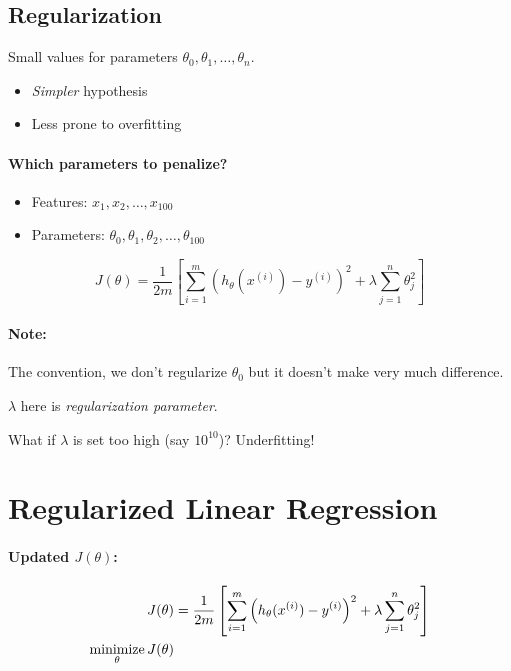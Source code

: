 \subsection*{Regularization}
Small values for parameters $\theta_0, \theta_1, \dots, \theta_n$.
\begin{itemize}
    \item \emph{Simpler} hypothesis
    \item Less prone to overfitting
\end{itemize}

\paragraph{Which parameters to penalize?}
\begin{itemize}
    \item Features: $x_1, x_2, \dots, x_{100}$
    \item Parameters: $\theta_0, \theta_1, \theta_2, \dots, \theta_{100}$
\end{itemize}
\begin{equation*}
    J(\theta) = \frac{1}{2m}\left[
        \sum_{i=1}^m\left(
        h_\theta(x^{(i)}) - y^{(i)}
        \right)^2 + \lambda\sum_{j=1}^n\theta_j^2
        \right]
\end{equation*}
\paragraph{Note:} The convention, we don't regularize $\theta_0$ but it doesn't
make very much difference.

$\lambda$ here is \emph{regularization parameter}.

What if $\lambda$ is set too high (say $10^{10}$)? Underfitting!

\section{Regularized Linear Regression}
\paragraph{Updated $J(\theta)$:}
\begin{align*}
    J(\theta) & = \frac{1}{2m}\left[
        \sum_{i=1}^m\left(
        h_\theta(x^{(i)}) - y^{(i)}
        \right)^2 + \lambda\sum_{j=1}^n\theta_j^2
        \right]                      \\
    \operatorname*{minimize}_\theta J(\theta)       \\
\end{align*}

